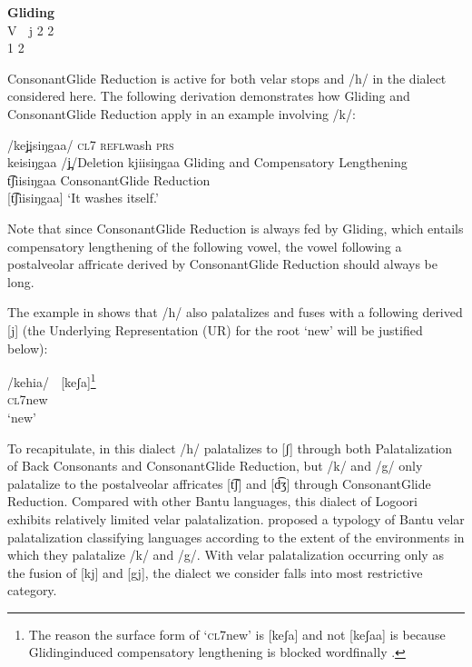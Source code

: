 \documentclass[output=paper]{langsci/langscibook}
\begin{document}
\ea{}
 \textbf{Gliding}\\{}
V  j 2 2\\{}
 1    2\\{}
\z

ConsonantGlide Reduction is active for both velar stops and /h/ in the dialect considered here. The following derivation demonstrates how Gliding and ConsonantGlide Reduction apply in an example involving /k/:

\ea{}
/kej̪isiŋgaa/  \textsc{cl7 refl}wash \textsc{prs}\\{} 
keisiŋgaa    /j̪/Deletion{\footnotemark}
kjiisiŋgaa    Gliding and Compensatory Lengthening\\{}
t͡ʃiisiŋgaa    ConsonantGlide Reduction\\{}
[t͡ʃiisiŋgaa]  ‘It washes itself.’\\{}
\z
{} 

Note that since ConsonantGlide Reduction is always fed by Gliding, which entails compensatory lengthening of the following vowel, the vowel following a postalveolar affricate derived by ConsonantGlide Reduction should always be long.

The example in  shows that /h/ also palatalizes and fuses with a following derived [j] (the Underlying Representation (UR) for the root ‘new’ will be justified below):


\ea{}
/kehia/{\rmfnm}   [keʃa]\footnote{The reason the surface form of ‘\textsc{cl7}new’ is [keʃa] and not [keʃaa] is because Glidinginduced compensatory lengthening is blocked wordfinally \citep{Leung1991}.} \\{}
\textsc{cl7}new\\{}
\glt ‘new’
\z
{}  



To recapitulate, in this dialect /h/ palatalizes to [ʃ] through both Palatalization of Back Consonants and ConsonantGlide Reduction, but /k/ and /g/ only palatalize to the postalveolar affricates [t͡ʃ] and [d͡ʒ] through ConsonantGlide Reduction. Compared with other Bantu languages, this dialect of Logoori exhibits relatively limited velar palatalization. \citet{HymanMoxley1996} proposed a typology of Bantu velar palatalization classifying languages according to the extent of the environments in which they palatalize /k/ and /g/. With velar palatalization occurring only as the fusion of [kj] and [gj], the dialect we consider falls into  most restrictive category. 
\end{document}

